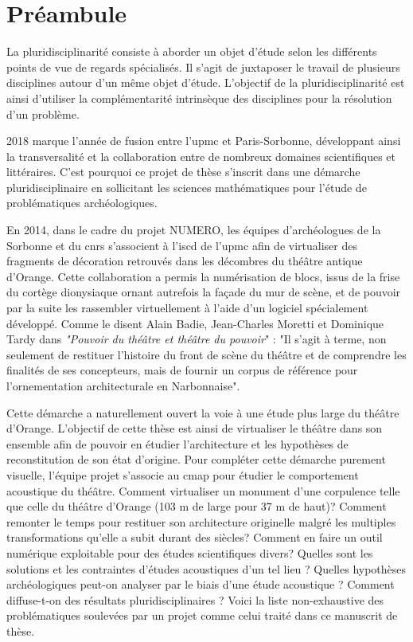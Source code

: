 \chapter*{Préambule}
	
	
			
La pluridisciplinarité consiste à aborder un objet d'étude selon les différents points de vue de regards spécialisés. Il s'agit de juxtaposer le travail de plusieurs disciplines autour d'un même objet d'étude. L'objectif de la pluridisciplinarité est ainsi d'utiliser la complémentarité intrinsèque des disciplines pour la résolution d'un problème. 

2018 marque l'année de fusion entre l'\gls{upmc} et Paris-Sorbonne, développant ainsi la transversalité et la collaboration entre de nombreux domaines scientifiques et littéraires. C'est pourquoi ce projet de thèse s'inscrit dans une démarche pluridisciplinaire en sollicitant les sciences mathématiques pour l'étude de problématiques archéologiques.
						
En 2014, dans le cadre du projet NUMERO, les équipes d'archéologues de la Sorbonne et du \gls{cnrs} s'associent à l'\gls{iscd} de l'\gls{upmc} afin de virtualiser des fragments de décoration retrouvés dans les décombres du théâtre antique d'Orange. Cette collaboration a permis la numérisation de blocs, issus de la frise du cortège dionysiaque ornant autrefois la façade du mur de scène, et de pouvoir par la suite les rassembler virtuellement à l'aide d'un logiciel spécialement développé. Comme le disent Alain Badie, Jean-Charles Moretti et Dominique Tardy dans \textit{"Pouvoir du théâtre et théâtre du pouvoir}" : "Il s'agit à terme, non seulement de restituer l'histoire du front de scène du théâtre et de comprendre les finalités de ses concepteurs, mais de fournir un corpus de référence pour l'ornementation architecturale en Narbonnaise".
			
Cette démarche a naturellement ouvert la voie à une étude plus large du théâtre d'Orange. L'objectif de cette thèse est ainsi de virtualiser le théâtre dans son ensemble afin de pouvoir en étudier l'architecture et les hypothèses de reconstitution de son état d'origine. Pour compléter cette démarche purement visuelle, l'équipe projet s'associe au \gls{cmap} pour étudier le comportement acoustique du théâtre. Comment virtualiser un monument d'une corpulence telle que celle du théâtre d'Orange (103 m de large pour 37 m de haut)? Comment remonter le temps pour restituer son architecture originelle malgré les multiples transformations qu'elle a subit durant des siècles? Comment en faire un outil numérique exploitable pour des études scientifiques divers? Quelles sont les solutions et les contraintes d'études acoustiques d'un tel lieu ? Quelles hypothèses archéologiques peut-on analyser par le biais d'une étude acoustique ? Comment diffuse-t-on des résultats pluridisciplinaires ? Voici la liste non-exhaustive des problématiques soulevées par un projet comme celui traité dans ce manuscrit de thèse. 
			
